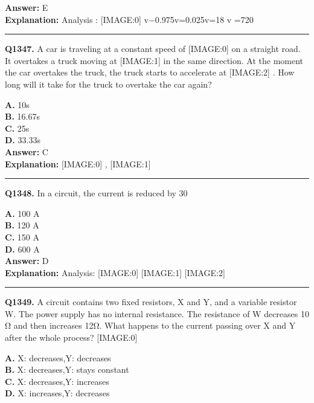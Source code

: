 \documentclass[12pt]{article}
\begin{document}
\textbf{Answer:} E \\
\textbf{Explanation:} Analysis
:
[IMAGE:0]
v−0.975v=0.025v=18
v
=720

\hrule
\vspace{1em}


\noindent
\textbf{Q1347.} A car is traveling at a constant speed of
[IMAGE:0]
on a straight road. It overtakes a truck moving at
[IMAGE:1]
in the same direction. At the moment the car overtakes the truck, the truck starts to accelerate at
[IMAGE:2]
. How long will it take for the truck to overtake the car again?



\textbf{A.} 10s \\
\textbf{B.} 16.67s \\
\textbf{C.} 25s \\
\textbf{D.} 33.33s \\

\textbf{Answer:} C \\
\textbf{Explanation:} [IMAGE:0]
,
[IMAGE:1]

\hrule
\vspace{1em}


\noindent
\textbf{Q1348.} In a circuit, the current is reduced by 30%



\textbf{A.} 100 A \\
\textbf{B.} 120 A \\
\textbf{C.} 150 A \\
\textbf{D.} 600 A \\

\textbf{Answer:} D \\
\textbf{Explanation:} Analysis:
[IMAGE:0]
[IMAGE:1]
[IMAGE:2]

\hrule
\vspace{1em}


\noindent
\textbf{Q1349.} A circuit contains two fixed resistors, X and Y, and a variable resistor W. The power supply has no internal resistance.
The resistance of W decreases 10 Ω and then increases 12Ω. What happens to the current passing over X and Y after the whole process?
[IMAGE:0]



\textbf{A.} X: decreases,Y: decreases \\
\textbf{B.} X: decreases,Y: stays constant \\
\textbf{C.} X: decreases,Y: increases \\
\textbf{D.} X: increases,Y: decreases \\
\end{document}
